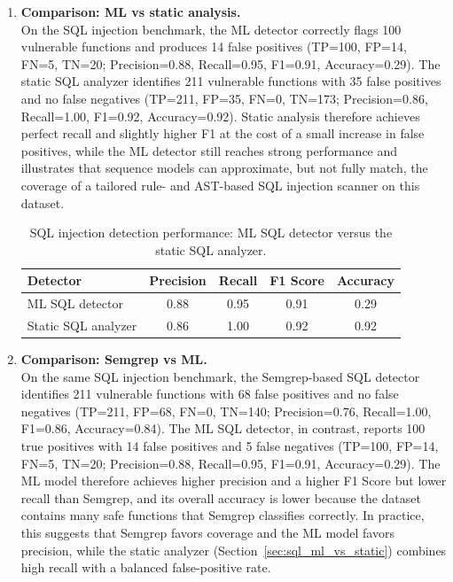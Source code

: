 \begin{enumerate}
  \item \textbf{Comparison: ML vs static analysis.}\\
  On the SQL injection benchmark, the ML detector correctly flags 100 vulnerable
  functions and produces 14 false positives (TP=100, FP=14, FN=5, TN=20; Precision=0.88,
  Recall=0.95, F1=0.91, Accuracy=0.29). The static SQL analyzer identifies 211 vulnerable
  functions with 35 false positives and no false negatives (TP=211, FP=35, FN=0, TN=173;
  Precision=0.86, Recall=1.00, F1=0.92, Accuracy=0.92). Static analysis therefore achieves
  perfect recall and slightly higher F1 at the cost of a small increase in false positives,
  while the ML detector still reaches strong performance and illustrates that sequence
  models can approximate, but not fully match, the coverage of a tailored rule- and
  AST-based SQL injection scanner on this dataset.

  \begin{table}[htbp]
    \centering
    \small
    \begin{tabular}{lcccc}
      \textbf{Detector} & \textbf{Precision} & \textbf{Recall} & \textbf{F1 Score} & \textbf{Accuracy} \\
      \hline
      ML SQL detector & 0.88 & 0.95 & 0.91 & 0.29 \\
      Static SQL analyzer & 0.86 & 1.00 & 0.92 & 0.92 \\
    \end{tabular}
    \caption{SQL injection detection performance: ML SQL detector versus the static SQL analyzer.}
    \label{tab:sql_ml_vs_static}
  \end{table}

  \item \textbf{Comparison: Semgrep vs ML.}\\
  On the same SQL injection benchmark, the Semgrep-based SQL detector identifies 211
  vulnerable functions with 68 false positives and no false negatives (TP=211, FP=68,
  FN=0, TN=140; Precision=0.76, Recall=1.00, F1=0.86, Accuracy=0.84). The ML SQL
  detector, in contrast, reports 100 true positives with 14 false positives and 5 false
  negatives (TP=100, FP=14, FN=5, TN=20; Precision=0.88, Recall=0.95, F1=0.91,
  Accuracy=0.29). The ML model therefore achieves higher precision and a higher F1
  Score but lower recall than Semgrep, and its overall accuracy is lower because the
  dataset contains many safe functions that Semgrep classifies correctly. In practice, this
  suggests that Semgrep favors coverage and the ML model favors precision, while the
  static analyzer (Section~\ref{sec:sql_ml_vs_static}) combines high recall with a balanced
  false-positive rate.


\end{enumerate}

